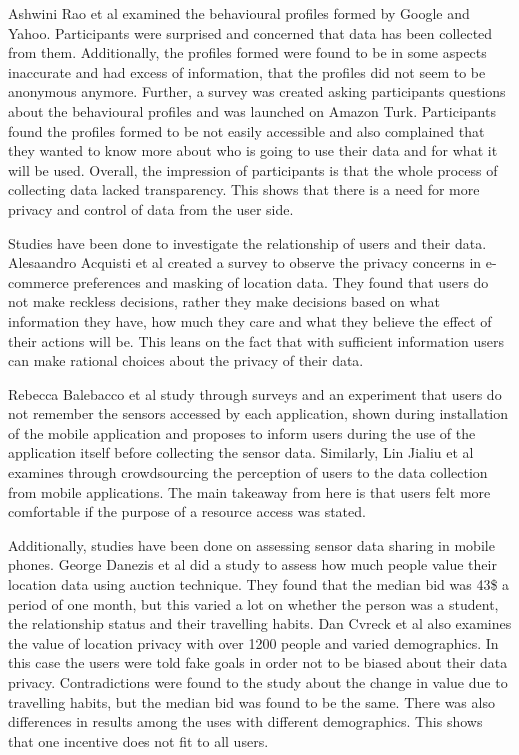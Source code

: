 Ashwini Rao et al \cite{rao2015they} examined the behavioural profiles formed by Google and Yahoo. Participants were surprised and concerned that data has been collected from them. Additionally, the profiles formed were found to be in some aspects inaccurate and had excess of information, that the profiles did not seem to be anonymous anymore. Further, a survey was created asking participants questions about the behavioural profiles and was launched on Amazon Turk. Participants found the profiles formed to be not easily accessible and also complained that they wanted to know more about who is going to use their data and for what it will be used. Overall, the impression of participants is that the whole process of collecting data lacked transparency. This shows that there is a need for more privacy and control of data from the user side.

Studies have been done to investigate the relationship of users and their data. Alesaandro Acquisti et al \cite{acquisti2005privacy} created a survey to observe the privacy concerns in e-commerce preferences and masking of location data. They found that users do not make reckless decisions, rather they make decisions based on what information they have, how much they care and what they believe the effect of their actions will be. This leans on the fact that with sufficient information users can make rational choices about the privacy of their data. 

Rebecca Balebacco et al \cite{balebako2015impact} study through surveys and an experiment that users do not remember the sensors accessed by each application, shown during installation of the mobile application and proposes to inform users during the use of the application itself before collecting the sensor data. Similarly, Lin Jialiu et al \cite{lin2012expectation} examines through crowdsourcing the perception of users to the data collection from mobile applications. The main takeaway from here is that users felt more comfortable if the purpose of a resource access was stated.

Additionally, studies have been done on assessing sensor data sharing in mobile phones. George Danezis et al \cite{danezis2005much} did a study to assess how much people value their location data using auction technique. They found that the median bid was 43\$ a period of one month, but this varied a lot on whether the person was a student, the relationship status and their travelling habits.  Dan Cvreck et al \cite{cvrcek2006study} also examines the value of location privacy with over 1200 people and varied demographics. In this case the users were told fake goals in order not to be biased about their data privacy. Contradictions were found to the study \cite{danezis2005much} about the change in value due to travelling habits, but the median bid was found to be the same. There was also differences in results among the uses with different demographics. This shows that one incentive does not fit to all users.

